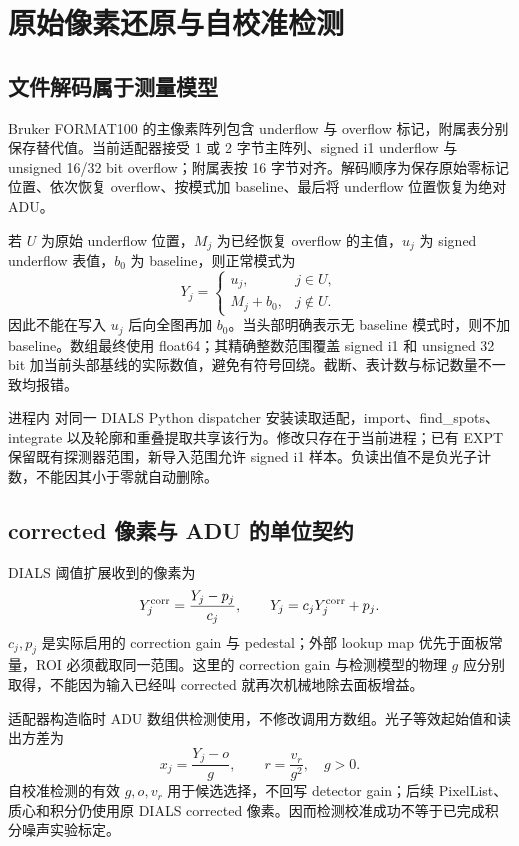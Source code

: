 \chapter{原始像素还原与自校准检测}
\section{文件解码属于测量模型}
Bruker FORMAT100 的主像素阵列包含 underflow 与 overflow 标记，附属表分别保存替代值。当前适配器接受 1 或 2 字节主阵列、signed i1 underflow 与 unsigned 16/32 bit overflow；附属表按 16 字节对齐。解码顺序为保存原始零标记位置、依次恢复 overflow、按模式加 baseline、最后将 underflow 位置恢复为绝对 ADU。

若 $U$ 为原始 underflow 位置，$M_j$ 为已经恢复 overflow 的主值，$u_j$ 为 signed underflow 表值，$b_0$ 为 baseline，则正常模式为
\begin{equation}
Y_j=\begin{cases}u_j,&j\in U,\\M_j+b_0,&j\notin U.\end{cases}
\end{equation}
因此不能在写入 $u_j$ 后向全图再加 $b_0$。当头部明确表示无 baseline 模式时，则不加 baseline。数组最终使用 float64；其精确整数范围覆盖 signed i1 和 unsigned 32 bit 加当前头部基线的实际数值，避免有符号回绕。截断、表计数与标记数量不一致均报错。

进程内  对同一 DIALS Python dispatcher 安装读取适配，import、find\_spots、integrate 以及轮廓和重叠提取共享该行为。修改只存在于当前进程；已有 EXPT 保留既有探测器范围，新导入范围允许 signed i1 样本。负读出值不是负光子计数，不能因其小于零就自动删除。
\section{corrected 像素与 ADU 的单位契约}
DIALS 阈值扩展收到的像素为
\begin{equation}
Y_j^{\rm corr}=\frac{Y_j-p_j}{c_j},\qquad
Y_j=c_jY_j^{\rm corr}+p_j.
\end{equation}
$c_j,p_j$ 是实际启用的 correction gain 与 pedestal；外部 lookup map 优先于面板常量，ROI 必须截取同一范围。这里的 correction gain 与检测模型的物理 $g$ 应分别取得，不能因为输入已经叫 corrected 就再次机械地除去面板增益。

适配器构造临时 ADU 数组供检测使用，不修改调用方数组。光子等效起始值和读出方差为
\begin{equation}
x_j=\frac{Y_j-o}{g},\qquad r=\frac{v_r}{g^2},\quad g>0.
\end{equation}
自校准检测的有效 $g,o,v_r$ 用于候选选择，不回写 detector gain；后续 PixelList、质心和积分仍使用原 DIALS corrected 像素。因而检测校准成功不等于已完成积分噪声实验标定。
